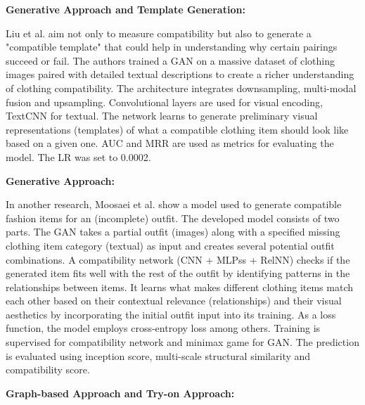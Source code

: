 \vspace{0.5cm}

\textbf{Generative Approach and Template Generation:}

\vspace{0.5cm}

Liu et al. aim not only to measure compatibility but also to generate a "compatible template" that could help in understanding why certain pairings succeed or fail. The authors trained a \acs{GAN} on a massive dataset of clothing images paired with detailed textual descriptions to create a richer understanding of clothing compatibility. The architecture integrates downsampling, multi-modal fusion and upsampling. Convolutional layers are used for visual encoding, TextCNN for textual. The network learns to generate preliminary visual representations (templates) of what a compatible clothing item should look like based on a given one. \acs{AUC} and \acs{MRR} are used as metrics for evaluating the model. The \acs{LR} was set to 0.0002. \cite[cf.]{liu_mgcm_2020}

\vspace{0.5cm}

\textbf{Generative Approach:}

\vspace{0.5cm}

In another research, Moosaei et al. show a model used to generate compatible fashion items for an (incomplete) outfit. The developed model consists of two parts. The \acs{GAN} takes a partial outfit (images) along with a specified missing clothing item category (textual) as input and creates several potential outfit combinations. A compatibility network (\acs{CNN} + \acsp{MLPs} + \acs{RelNN}) checks if the generated item fits well with the rest of the outfit by identifying patterns in the relationships between items. It learns what makes different clothing items match each other based on their contextual relevance (relationships) and their visual aesthetics by incorporating the initial outfit input into its training. As a loss function, the model employs cross-entropy loss among others. Training is supervised for compatibility network and minimax game for \acs{GAN}. The prediction is evaluated using inception score, multi-scale structural similarity and compatibility score. \cite[cf.]{moosaei_outfitgan_2022}

\vspace{0.5cm}

\textbf{Graph-based Approach and Try-on Approach:}

